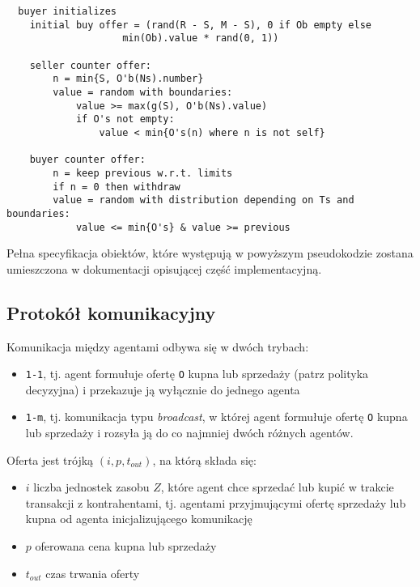 \documentclass[]{article}
\providecommand{\tightlist}{%
  \setlength{\itemsep}{0pt}\setlength{\parskip}{0pt}}
\begin{document}
\begin{verbatim}
  buyer initializes
    initial buy offer = (rand(R - S, M - S), 0 if Ob empty else
                    min(Ob).value * rand(0, 1))
   
    seller counter offer:
        n = min{S, O'b(Ns).number}
        value = random with boundaries:
            value >= max(g(S), O'b(Ns).value)
            if O's not empty:
                value < min{O's(n) where n is not self}

    buyer counter offer:
        n = keep previous w.r.t. limits
        if n = 0 then withdraw
        value = random with distribution depending on Ts and boundaries:
            value <= min{O's} & value >= previous
\end{verbatim}

Pełna specyfikacja obiektów, które występują w powyższym pseudokodzie
zostana umieszczona w dokumentacji opisującej część implementacyjną.

\hypertarget{protokuxf3ux142-komunikacyjny}{%
\subsection{Protokół
komunikacyjny}\label{protokuxf3ux142-komunikacyjny}}

Komunikacja między agentami odbywa się w dwóch trybach:

\begin{itemize}
\tightlist
\item
  \texttt{1-1}, tj. agent formułuje ofertę \texttt{O} kupna lub
  sprzedaży (patrz polityka decyzyjna) i przekazuje ją wyłącznie do
  jednego agenta
\item
  \texttt{1-m}, tj. komunikacja typu \emph{broadcast}, w której agent
  formułuje ofertę \texttt{O} kupna lub sprzedaży i rozsyła ją do co
  najmniej dwóch różnych agentów.
\end{itemize}

Oferta jest trójką \((i, p, t_{out})\), na którą składa się:

\begin{itemize}
\tightlist
\item
  \(i\) liczba jednostek zasobu \(Z\), które agent chce sprzedać lub
  kupić w trakcie transakcji z kontrahentami, tj. agentami przyjmującymi
  ofertę sprzedaży lub kupna od agenta inicjalizującego komunikację
\item
  \(p\) oferowana cena kupna lub sprzedaży
\item
  \(t_{out}\) czas trwania oferty
\end{itemize}
\end{document}
